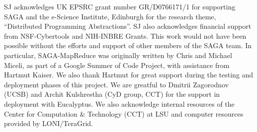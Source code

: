 \documentclass[conference,final]{IEEEtran}
\newcommand{\sagamapreduce }{SAGA-MapReduce }
\begin{document}
SJ acknowledges UK EPSRC grant number GR/D0766171/1 for supporting
SAGA and the e-Science Institute, Edinburgh for the research theme,
``Distributed Programming Abstractions''.  SJ also acknowledges
financial support from NSF-Cybertools and NIH-INBRE Grants. This work
would not have been possible without the efforts and support of other
members of the SAGA team.  In particular, \sagamapreduce was
originally written by Chris and Michael Miceli, as part of a Google
Summer of Code Project, with assistance from Hartmut Kaiser. We also
thank Hartmut for great support during the testing and deployment
phases of this project. We are greatful to Dmitrii Zagorodnov (UCSB)
and Archit Kulshrestha (CyD group, CCT) for the support in deployment
with Eucalyptus.  We also acknowledge internal resources of the Center
for Computation \& Technology (CCT) at LSU and computer resources
provided by LONI/TeraGrid.  

\end{document}
